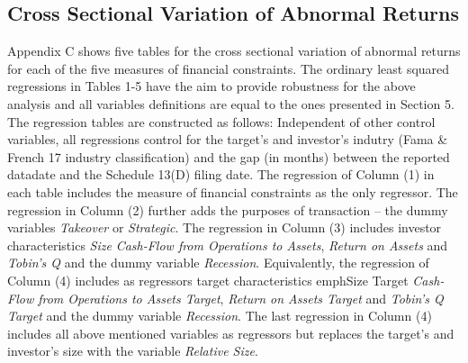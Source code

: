 \documentclass[12pt]{article}
\begin{document}
\begin{appendices}
\section{Cross Sectional Variation of Abnormal Returns}
\noindent Appendix C shows five tables for the cross sectional variation of abnormal returns for each of the five measures of financial constraints. The ordinary least squared regressions in Tables 1-5 have the aim to provide robustness for the above analysis and all variables definitions are equal to the ones presented in Section 5. The regression tables are constructed as follows: Independent of other control variables, all regressions control for the target's and investor's indutry (Fama \& French 17 industry classification) and the gap (in months) between the reported datadate and the Schedule 13(D) filing date. The regression of Column (1) in each table includes the measure of financial constraints as the only regressor. The regression in Column (2) further adds the purposes of transaction -- the dummy variables \emph{Takeover} or \emph{Strategic}. The regression in Column (3) includes investor characteristics \emph{Size} \emph{Cash-Flow from Operations to Assets}, \emph{Return on Assets} and \emph{Tobin's Q} and the dummy variable \emph{Recession}. Equivalently, the regression of Column (4) includes as regressors target characteristics emph{Size Target} \emph{Cash-Flow from Operations to Assets Target}, \emph{Return on Assets Target} and \emph{Tobin's Q Target} and the dummy variable \emph{Recession}. The last regression in Column (4) includes all above mentioned variables as regressors but replaces the target's and investor's size with the variable \emph{Relative Size}.


\end{appendices}
\end{document}
